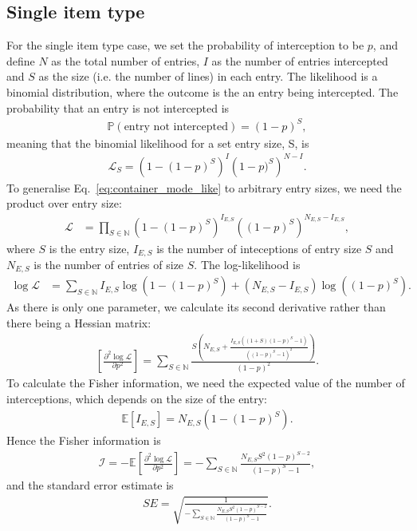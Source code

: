 \documentclass{article}
\begin{document}
\subsection{Single item type}
For the single item type case, we set the probability of interception to be \(p\), and define \(N\) as the total number of entries, \(I\) as the number of entries intercepted and \(S\) as the size (i.e. the number of lines) in each entry. The likelihood is a binomial distribution, where the outcome is the an entry being intercepted. The probability that an entry is not intercepted is
\begin{align}
\mathbb{P}(\text{entry not intercepted}) = (1-p)^S,
\end{align}
meaning that the binomial likelihood for a set entry size, S, is
\begin{align}
\mathcal{L}_S = \left(1-(1-p)^S\right)^I\left(1-p)^S\right)^{N-I}. \label{eq:container_mode_like}
\end{align}
To generalise Eq.~\eqref{eq:container_mode_like} to arbitrary entry sizes, we need the product over entry size:
\begin{align}
\mathcal{L}& = \prod_{S\in\mathbb{N}} \left(1-(1-p)^S\right)^{I_{E,S}}\left((1-p)^S\right)^{N_{E,S}-I_{E,S}},
\label{eq:aymptotic_full_likelihood}
\end{align}
where \(S\) is the entry size, \(I_{E,S}\) is the number of inteceptions of entry size \(S\) and \(N_{E,S}\) is the number of entries of size \(S\).  The log-likelihood is
\begin{align}
\log\mathcal{L}& = \sum_{S\in\mathbb{N}}{I_{E,S}} \log\left(1-(1-p)^S\right)+(N_{E,S}-I_{E,S})\log\left((1-p)^S\right).
\label{eq:loglikelihood_arbitrary_entry_size}
\end{align}
As there is only one parameter, we calculate its second derivative rather than there being a Hessian matrix:
\begin{align}
\left[\frac{\partial^2 \log\mathcal{L}}{\partial p^2}\right]= \sum_{S\in\mathbb{N}}
\frac{S\left(N_{E,S} + \frac{I_{E,S}((1+S)(1-p)^S-1)}
{\left((1-p)^S-1 \right)^2} \right)}
{(1-p)^2}.\label{eq:loglike_2nd_deriv}
\end{align}
To calculate the Fisher information, we need the expected value of the number of interceptions, which depends on the size of the entry:
\begin{align}
\mathbb{E}\left[I_{E,S}\right] = N_{E,S}(1-(1-p)^S). \label{eq:exp_intercept}
\end{align} 
Hence the Fisher information is
\begin{align}
\mathcal{I} = -\mathbb{E}\left[\frac{\partial^2 \log\mathcal{L}}{\partial p^2}\right]=
 -\sum_{S\in\mathbb{N}}\frac{N_{E,S}S^2(1-p)^{S-2}}{(1-p)^S-1}, \label{eq:fisher_information}
\end{align}
and the standard error estimate is
\begin{align}
SE = \sqrt{\frac{1}{-\sum_{S\in\mathbb{N}}\frac{N_{E,S}S^2(1-p)^{S-2}}{(1-p)^S-1}}}.\label{eq:general_SE_calc}
\end{align}
\end{document}
